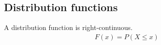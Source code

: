 \subsection{Distribution functions}\label{distribution function 的性质}
A distribution function is right-continuous.
\begin{align}\label{eq:cdf}
  F(x) = P(X \le x)
\end{align}
